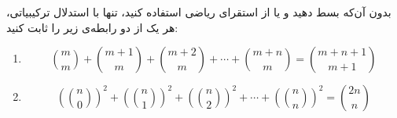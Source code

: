 \EXERCISE
بدون آن‌که بسط دهید و یا از استقرای ریاضی استفاده کنید، تنها با استدلال ترکیبیاتی، هر یک از دو رابطه‌ی زیر را ثابت کنید:
\begin{enumerate}
\item
$$\binom{m}{m} + \binom{m+1}{m} + \binom{m+2}{m} + \cdots + \binom{m+n}{m} = \binom{m + n + 1}{m + 1}$$
\item
$$(\binom{n}{0})^2 + (\binom{n}{1})^2 + (\binom{n}{2})^2 + \cdots + (\binom n n)^2 = \binom{2n}{n}$$
\end{enumerate}